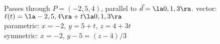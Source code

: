{Passes through $P=(-2,5,4)$, parallel to $\vec d = \la 0,1, 3\ra$.
}
{vector: $\ell(t) = \la-2,5,4\ra + t\la 0,1, 3\ra$\\
parametric: $x= -2$, $y=5+t$, $z=4+3t$\\
symmetric: $x=-2$, $y-5=(z-4)/3$
}

